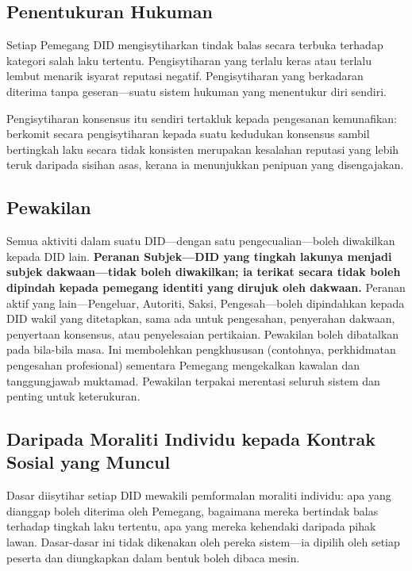 \documentclass[11pt,a4paper,twocolumn]{article}
\begin{document}
\subsection{Penentukuran Hukuman}

Setiap Pemegang DID mengisytiharkan tindak balas secara terbuka terhadap kategori salah laku tertentu. Pengisytiharan yang terlalu keras atau terlalu lembut menarik isyarat reputasi negatif. Pengisytiharan yang berkadaran diterima tanpa geseran---suatu sistem hukuman yang menentukur diri sendiri.

Pengisytiharan konsensus itu sendiri tertakluk kepada pengesanan kemunafikan: berkomit secara pengisytiharan kepada suatu kedudukan konsensus sambil bertingkah laku secara tidak konsisten merupakan kesalahan reputasi yang lebih teruk daripada sisihan asas, kerana ia menunjukkan penipuan yang disengajakan.

\subsection{Pewakilan}

Semua aktiviti dalam suatu DID---dengan satu pengecualian---boleh diwakilkan kepada DID lain. \textbf{Peranan Subjek---DID yang tingkah lakunya menjadi subjek dakwaan---tidak boleh diwakilkan; ia terikat secara tidak boleh dipindah kepada pemegang identiti yang dirujuk oleh dakwaan.} Peranan aktif yang lain---Pengeluar, Autoriti, Saksi, Pengesah---boleh dipindahkan kepada DID wakil yang ditetapkan, sama ada untuk pengesahan, penyerahan dakwaan, penyertaan konsensus, atau penyelesaian pertikaian. Pewakilan boleh dibatalkan pada bila-bila masa. Ini membolehkan pengkhususan (contohnya, perkhidmatan pengesahan profesional) sementara Pemegang mengekalkan kawalan dan tanggungjawab muktamad. Pewakilan terpakai merentasi seluruh sistem dan penting untuk keterukuran.

\subsection{Daripada Moraliti Individu kepada Kontrak Sosial yang Muncul}

Dasar diisytihar setiap DID mewakili pemformalan moraliti individu: apa yang dianggap boleh diterima oleh Pemegang, bagaimana mereka bertindak balas terhadap tingkah laku tertentu, apa yang mereka kehendaki daripada pihak lawan. Dasar-dasar ini tidak dikenakan oleh pereka sistem---ia dipilih oleh setiap peserta dan diungkapkan dalam bentuk boleh dibaca mesin.
\end{document}
